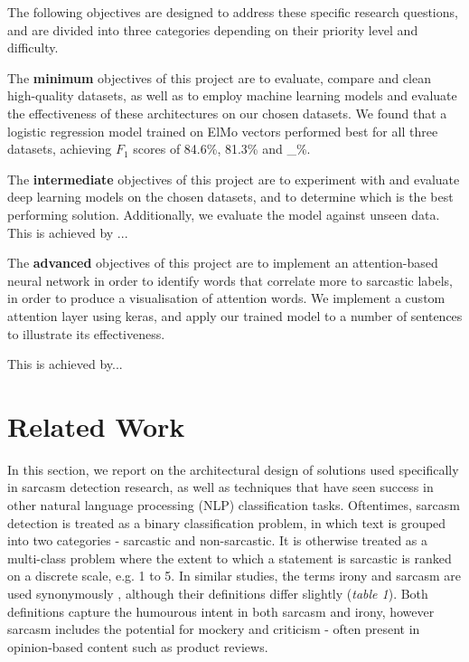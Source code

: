 \documentclass[12pt,a4paper]{article}
\begin{document}
\noindent The following objectives are designed to address these specific research questions, and are divided into three categories depending on their priority level and difficulty.

The \textbf{minimum} objectives of this project are to evaluate, compare and clean high-quality datasets, as well as to employ machine learning models and evaluate the effectiveness of these architectures on our chosen datasets. We found that a logistic regression model trained on ElMo vectors performed best for all three datasets, achieving $F_{1}$ scores of 84.6\%, 81.3\% and \_\%. 

The \textbf{intermediate} objectives of this project are to experiment with and evaluate deep learning models on the chosen datasets, and to determine which is the best performing solution. Additionally, we evaluate the model against unseen data. This is achieved by ...

The \textbf{advanced} objectives of this project are to implement an attention-based neural network in order to identify words that correlate more to sarcastic labels, in order to produce a visualisation of attention words. We implement a custom attention layer using keras, and apply our trained model to a number of sentences to illustrate its effectiveness.

This is achieved by...





\section{Related Work}
\noindent In this section, we report on the architectural design of solutions used specifically in sarcasm detection research, as well as techniques that have seen success in other natural language processing (NLP) classification tasks. Oftentimes, sarcasm detection is treated as a binary classification problem, in which text is grouped into two categories - sarcastic and non-sarcastic. It is otherwise treated as a multi-class problem where the extent to which a statement is sarcastic is ranked on a discrete scale, e.g. 1 to 5. In similar studies, the terms irony and sarcasm are used synonymously \cite{tsur2010icwsm}, although their definitions differ slightly (\textit{table 1}). Both definitions capture the humourous intent in both sarcasm and irony, however sarcasm includes the potential for mockery and criticism - often present in opinion-based content such as product reviews.\vspace{-2pt}
\end{document}
